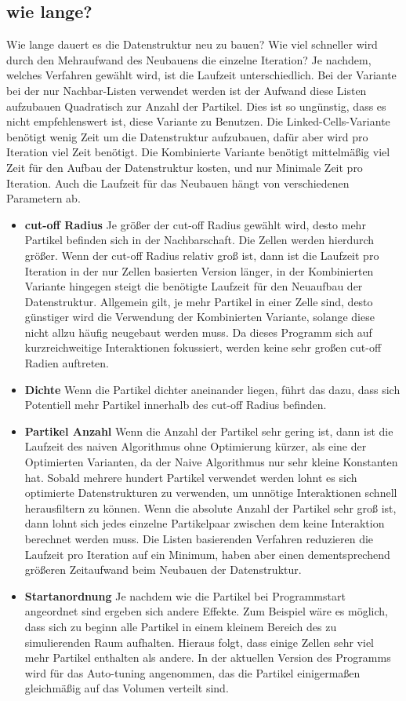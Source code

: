 \documentclass[
	12pt,
	a4paper,
	BCOR10mm,
	DIV14,
	headsepline,
]{scrreprt}
\begin{document}
\subsection{wie lange?}
	Wie lange dauert es die Datenstruktur neu zu bauen? Wie viel schneller wird durch den Mehraufwand des Neubauens die einzelne Iteration? Je nachdem, welches Verfahren gewählt wird, ist die Laufzeit unterschiedlich. Bei der Variante bei der nur Nachbar-Listen verwendet werden ist der Aufwand diese Listen aufzubauen Quadratisch zur Anzahl der Partikel. Dies ist so ungünstig, dass es nicht empfehlenswert ist, diese Variante zu Benutzen. Die Linked-Cells-Variante benötigt wenig Zeit um die Datenstruktur aufzubauen, dafür aber wird pro Iteration viel Zeit benötigt. Die Kombinierte Variante benötigt mittelmäßig viel Zeit für den Aufbau der Datenstruktur kosten, und nur Minimale Zeit pro Iteration. Auch die Laufzeit für das Neubauen hängt von verschiedenen Parametern ab.
	\begin{itemize}
		\item \textbf{cut-off Radius} Je größer der cut-off Radius gewählt wird, desto mehr Partikel befinden sich in der Nachbarschaft. Die Zellen werden hierdurch größer. Wenn der cut-off Radius relativ groß ist, dann ist die Laufzeit pro Iteration in der nur Zellen basierten Version länger, in der Kombinierten Variante hingegen steigt die benötigte Laufzeit für den Neuaufbau der Datenstruktur. Allgemein gilt, je mehr Partikel in einer Zelle sind, desto günstiger wird die Verwendung der Kombinierten Variante, solange diese nicht allzu häufig neugebaut werden muss. Da dieses Programm sich auf kurzreichweitige Interaktionen fokussiert, werden keine sehr großen cut-off Radien auftreten.
		\item \textbf{Dichte} Wenn die Partikel dichter aneinander liegen, führt das dazu, dass sich Potentiell mehr Partikel innerhalb des cut-off Radius befinden.
		\item \textbf{Partikel Anzahl} Wenn die Anzahl der Partikel sehr gering ist, dann ist die Laufzeit des naiven Algorithmus ohne Optimierung kürzer, als eine der Optimierten Varianten, da der Naive Algorithmus nur sehr kleine Konstanten hat. Sobald mehrere hundert Partikel verwendet werden lohnt es sich optimierte Datenstrukturen zu verwenden, um unnötige Interaktionen schnell herausfiltern zu können. Wenn die absolute Anzahl der Partikel sehr groß ist, dann lohnt sich jedes einzelne Partikelpaar zwischen dem keine Interaktion berechnet werden muss. Die Listen basierenden Verfahren reduzieren die Laufzeit pro Iteration auf ein Minimum, haben aber einen dementsprechend größeren Zeitaufwand beim Neubauen der Datenstruktur. 
		\item \textbf{Startanordnung} Je nachdem wie die Partikel bei Programmstart angeordnet sind ergeben sich andere Effekte. Zum Beispiel wäre es möglich, dass sich zu beginn alle Partikel in einem kleinem Bereich des zu simulierenden Raum aufhalten. Hieraus folgt, dass einige Zellen sehr viel mehr Partikel enthalten als andere. In der aktuellen Version des Programms wird für das Auto-tuning angenommen, das die Partikel einigermaßen gleichmäßig auf das Volumen verteilt sind.
	\end{itemize}
\end{document}
